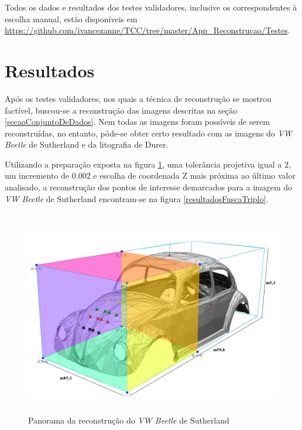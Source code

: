 		Todos os dados e resultados dos testes validadores, inclusive os correspondentes à escolha manual, estão disponíveis em \url{https://github.com/ivancezanne/TCC/tree/master/App_Reconstrucao/Testes}.
		
		\section{Resultados}
			\label{secaoResultados}
			
			Após os testes validadores, nos quais a técnica de reconstrução se mostrou factível, buscou-se a reconstrução das imagens descritas na seção \ref{secaoConjuntoDeDados}. Nem todas as imagens foram possíveis de serem reconstruídas, no entanto, pôde-se obter certo resultado com as imagens do \textit{VW Beetle} de Sutherland e da litografia de Durer.
			
			Utilizando a preparação exposta na figura \ref{printTesteFusca}, uma tolerância projetiva igual a $2$, um incremento de $0.002$ e escolha de coordenada Z mais próxima ao último valor analisado, a reconstrução dos pontos de interesse demarcados para a imagem do \textit{VW Beetle} de Sutherland encontram-se na figura \ref{resultadosFuscaTriplo}.
			
			\begin{figure}[!htb]
				\centering
				\includegraphics[height=9cm]{imagens/printTesteFusca.png}
				\caption{Panorama da reconstrução do \textit{VW Beetle} de Sutherland}
				\label{printTesteFusca}
			\end{figure}
			
